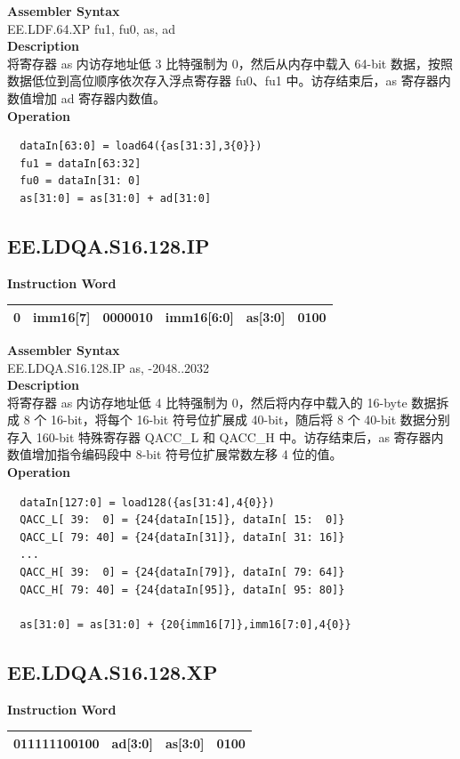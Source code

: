 \textbf{Assembler Syntax} \\
EE.LDF.64.XP fu1, fu0, as, ad \\
\textbf{Description} \\
将寄存器 as 内访存地址低 3 比特强制为 0，然后从内存中载入 64-bit 数据，按照数据低位到高位顺序依次存入浮点寄存器 fu0、fu1 中。访存结束后，as 寄存器内数值增加 ad 寄存器内数值。\\
\textbf{Operation}
\begin{lstlisting}
  dataIn[63:0] = load64({as[31:3],3{0}})
  fu1 = dataIn[63:32]
  fu0 = dataIn[31: 0]
  as[31:0] = as[31:0] + ad[31:0]
\end{lstlisting}

\clearpage
\subsection{EE.LDQA.S16.128.IP}\label{instruction:EELDQAS16128IP}
\setlength\tabcolsep{6pt}
\textbf{Instruction Word} \\
\begin{tabular}{|c|c|c|c|c|c|}
	\hline
	0 & imm16[7] & 0000010 & imm16[6:0] & as[3:0] & 0100 \\
	\hline
\end{tabular}

\textbf{Assembler Syntax} \\
EE.LDQA.S16.128.IP as, -2048..2032 \\
\textbf{Description} \\
将寄存器 as 内访存地址低 4 比特强制为 0，然后将内存中载入的 16-byte 数据拆成 8 个 16-bit，将每个 16-bit 符号位扩展成 40-bit，随后将 8 个 40-bit 数据分别存入 160-bit 特殊寄存器 QACC\_L 和 QACC\_H 中。访存结束后，as 寄存器内数值增加指令编码段中 8-bit 符号位扩展常数左移 4 位的值。\\
\textbf{Operation}
\begin{lstlisting}
  dataIn[127:0] = load128({as[31:4],4{0}})
  QACC_L[ 39:  0] = {24{dataIn[15]}, dataIn[ 15:  0]}
  QACC_L[ 79: 40] = {24{dataIn[31]}, dataIn[ 31: 16]}
  ...
  QACC_H[ 39:  0] = {24{dataIn[79]}, dataIn[ 79: 64]}
  QACC_H[ 79: 40] = {24{dataIn[95]}, dataIn[ 95: 80]}

  as[31:0] = as[31:0] + {20{imm16[7]},imm16[7:0],4{0}}
\end{lstlisting}

\clearpage
\subsection{EE.LDQA.S16.128.XP}\label{instruction:EELDQAS16128XP}
\setlength\tabcolsep{6pt}
\textbf{Instruction Word} \\
\begin{tabular}{|c|c|c|c|}
	\hline
	011111100100 & ad[3:0] & as[3:0] & 0100 \\
	\hline
\end{tabular}

